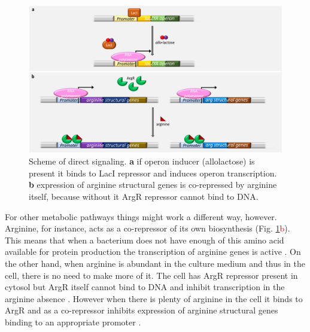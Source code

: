 \begin{figure}[ht]
  \centering
  \includegraphics[scale=0.27]{text/Pictures/DirectSignaling.png}
	\caption{Scheme of direct signaling. \textbf{a} if  operon inducer (allolactose) is present it binds to LacI repressor and induces  operon transcription. \textbf{b} expression of arginine structural genes is co-repressed by arginine itself, because without it ArgR repressor cannot bind to DNA.}
	\label{dir}
\end{figure}

For other metabolic pathways things might work a different way, however.
Arginine, for instance, acts as a co-repressor of its own biosynthesis (Fig. \ref{dir}\textcolor{red}{b}).
This means that when a bacterium does not have enough of this amino acid available for protein production the transcription of arginine genes is active \cite{charlier2004biosynthesis, caldara2006arginine}.
On the other hand, when arginine is abundant in the culture medium and thus in the cell, there is no need to make more of it.
The cell has ArgR repressor present in cytosol but ArgR itself cannot bind to DNA and inhibit transcription in the arginine absence \cite{clark2005molecular, caldara2006arginine}.
However when there is plenty of arginine in the cell it binds to ArgR and as a co-repressor inhibits expression of arginine structural genes binding to an appropriate promoter \cite{charlier1992arginine, charlier2004biosynthesis, clark2005molecular}.

